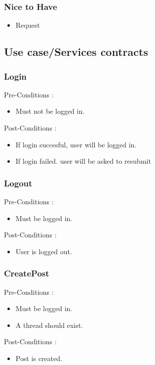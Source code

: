 \documentclass[12pt, oneside]{article}
\begin{document}
		\subsubsection{Nice to Have}
			\begin{itemize}
				\item Request
			 \end{itemize}
	\subsection{Use case/Services contracts}
			\subsubsection{Login}
				Pre-Conditions : \begin{itemize}
							\item Must not be logged in.
						     \end{itemize}
				Post-Conditions : \begin{itemize}
							\item If login succesful, user will be logged in.
							\item If login failed. user will be asked to resubmit
						     \end{itemize}
			\subsubsection{Logout}
				Pre-Conditions : \begin{itemize}
							\item Must be logged in.
						     \end{itemize}
				Post-Conditions : \begin{itemize}
							\item User is logged out.
						     \end{itemize}
			\subsubsection{CreatePost}
				Pre-Conditions : \begin{itemize}
							\item Must be logged in.
							\item A thread should exist.
						     \end{itemize}
				Post-Conditions : \begin{itemize}
							\item Post is created.
						     \end{itemize}
\end{document}
